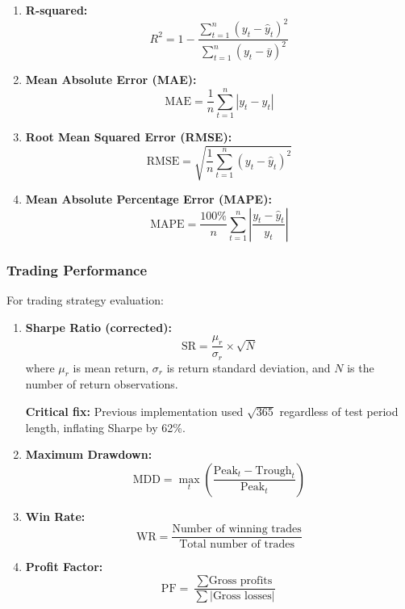 \documentclass[11pt,a4paper]{article}
\begin{document}
\begin{enumerate}
    \item \textbf{R-squared:}
    \begin{equation}
    R^2 = 1 - \frac{\sum_{t=1}^{n}(y_t - \hat{y}_t)^2}{\sum_{t=1}^{n}(y_t - \bar{y})^2}
    \end{equation}

    \item \textbf{Mean Absolute Error (MAE):}
    \begin{equation}
    \text{MAE} = \frac{1}{n}\sum_{t=1}^{n}|y_t - \hat{y}_t|
    \end{equation}

    \item \textbf{Root Mean Squared Error (RMSE):}
    \begin{equation}
    \text{RMSE} = \sqrt{\frac{1}{n}\sum_{t=1}^{n}(y_t - \hat{y}_t)^2}
    \end{equation}

    \item \textbf{Mean Absolute Percentage Error (MAPE):}
    \begin{equation}
    \text{MAPE} = \frac{100\%}{n}\sum_{t=1}^{n}\left|\frac{y_t - \hat{y}_t}{y_t}\right|
    \end{equation}
\end{enumerate}

\subsubsection{Trading Performance}

For trading strategy evaluation:

\begin{enumerate}
    \item \textbf{Sharpe Ratio (corrected):}
    \begin{equation}
    \text{SR} = \frac{\mu_r}{\sigma_r} \times \sqrt{N}
    \end{equation}
    where $\mu_r$ is mean return, $\sigma_r$ is return standard deviation, and $N$ is the number of return observations.

    \textbf{Critical fix:} Previous implementation used $\sqrt{365}$ regardless of test period length, inflating Sharpe by 62\%.

    \item \textbf{Maximum Drawdown:}
    \begin{equation}
    \text{MDD} = \max_{t} \left(\frac{\text{Peak}_t - \text{Trough}_t}{\text{Peak}_t}\right)
    \end{equation}

    \item \textbf{Win Rate:}
    \begin{equation}
    \text{WR} = \frac{\text{Number of winning trades}}{\text{Total number of trades}}
    \end{equation}

    \item \textbf{Profit Factor:}
    \begin{equation}
    \text{PF} = \frac{\sum \text{Gross profits}}{\sum |\text{Gross losses}|}
    \end{equation}
\end{enumerate}
\end{document}
